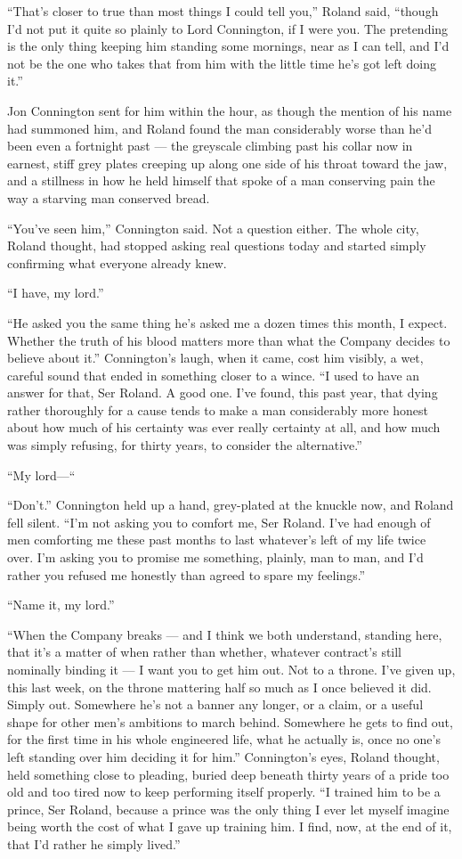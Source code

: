 “That’s closer to true than most things I could tell you,” Roland said, “though I’d not put it quite so plainly to Lord Connington, if I were you. The pretending is the only thing keeping him standing some mornings, near as I can tell, and I’d not be the one who takes that from him with the little time he’s got left doing it.”

\sceneBreak

Jon Connington sent for him within the hour, as though the mention of his name had summoned him, and Roland found the man considerably worse than he’d been even a fortnight past — the greyscale climbing past his collar now in earnest, stiff grey plates creeping up along one side of his throat toward the jaw, and a stillness in how he held himself that spoke of a man conserving pain the way a starving man conserved bread.

“You’ve seen him,” Connington said. Not a question either. The whole city, Roland thought, had stopped asking real questions today and started simply confirming what everyone already knew.

“I have, my lord.”

“He asked you the same thing he’s asked me a dozen times this month, I expect. Whether the truth of his blood matters more than what the Company decides to believe about it.” Connington’s laugh, when it came, cost him visibly, a wet, careful sound that ended in something closer to a wince. “I used to have an answer for that, Ser Roland. A good one. I’ve found, this past year, that dying rather thoroughly for a cause tends to make a man considerably more honest about how much of his certainty was ever really certainty at all, and how much was simply refusing, for thirty years, to consider the alternative.”

“My lord—“

“Don’t.” Connington held up a hand, grey-plated at the knuckle now, and Roland fell silent. “I’m not asking you to comfort me, Ser Roland. I’ve had enough of men comforting me these past months to last whatever’s left of my life twice over. I’m asking you to promise me something, plainly, man to man, and I’d rather you refused me honestly than agreed to spare my feelings.”

“Name it, my lord.”

“When the Company breaks — and I think we both understand, standing here, that it’s a matter of when rather than whether, whatever contract’s still nominally binding it — I want you to get him out. Not to a throne. I’ve given up, this last week, on the throne mattering half so much as I once believed it did. Simply out. Somewhere he’s not a banner any longer, or a claim, or a useful shape for other men’s ambitions to march behind. Somewhere he gets to find out, for the first time in his whole engineered life, what he actually is, once no one’s left standing over him deciding it for him.” Connington’s eyes, Roland thought, held something close to pleading, buried deep beneath thirty years of a pride too old and too tired now to keep performing itself properly. “I trained him to be a prince, Ser Roland, because a prince was the only thing I ever let myself imagine being worth the cost of what I gave up training him. I find, now, at the end of it, that I’d rather he simply lived.”

